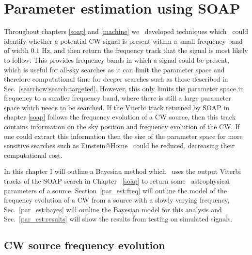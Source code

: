 \chapter{\label{par_est}Parameter estimation using SOAP}

Throughout chapters \ref{soap} and \ref{machine} we~ developed
techniques which~ could identify whether a potential \gls{CW}
signal is present within a small frequency band of width $0.1$ Hz, and then
return the frequency track that the signal is most likely to follow.  This
provides frequency bands in which a signal could be present, which is useful
for all-sky searches as it can limit the parameter space and therefore
computational time for deeper searches such as those described in
Sec.~\ref{searchcw:search:targeted}.  However, this only limits the parameter
space in frequency to a smaller frequency band, where there is still a large
parameter space which needs to be searched.  If the Viterbi track returned by
SOAP in chapter \ref{soap} follows the frequency evolution of a \gls{CW}
source, then this track contains information on the sky position and frequency
evolution of the \gls{CW}.  If one could extract this information then the size
of the parameter space for more sensitive searches such as
Einstein@Home~ could be
reduced, decreasing their computational cost.

In this chapter I will outline a Bayesian method which~ uses the output Viterbi tracks of the SOAP search in Chapter
~\ref{soap} to return some~ astrophysical parameters of a
source.  Section~\ref{par_est:freq} will outline the model of the frequency
evolution of a \gls{CW} from a source with a slowly varying frequency,
Sec.~\ref{par_est:bayes} will outline the Bayesian model for this analysis and
Sec.~\ref{par_est:results} will show the results from testing on simulated
signals.

\section{\label{par_est:freq}\gls{CW} source frequency evolution}

